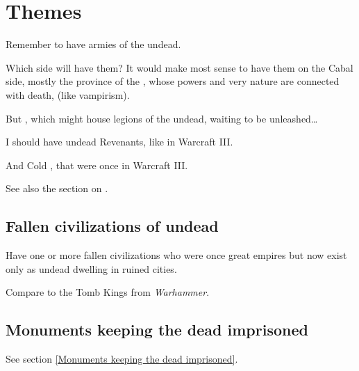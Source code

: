 \section{Themes}
Remember to have armies of the undead.

Which side will have them? It would make most sense to have them on the Cabal side, mostly the province of the \banes, whose powers and very nature are connected with death,  (like vampirism). 

But , which might house legions of the undead, waiting to be unleashed\ldots{}

I should have undead Revenants, like in Warcraft III. 

And Cold , that were once in Warcraft III. 

See also the section on .








\subsection{Fallen civilizations of undead}
Have one or more fallen civilizations who were once great empires but now exist only as undead dwelling in ruined cities. 

Compare to the Tomb Kings from \emph{Warhammer}. 







\subsection{Monuments keeping the dead imprisoned}
See section \ref{Monuments keeping the dead imprisoned}.









